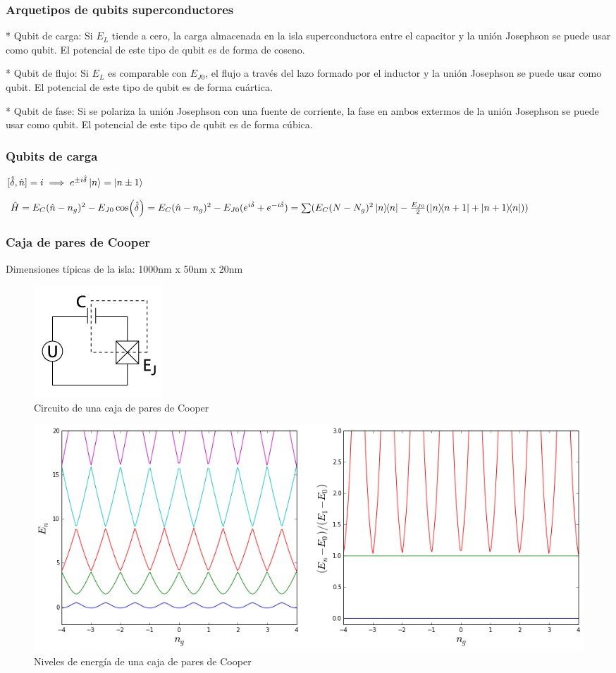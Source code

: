 \documentclass[xetex,mathserif,serif]{beamer}
\begin{document}
\begin{frame}
    \frametitle{Arquetipos de qubits superconductores}

\justify
* Qubit de carga: Si $E_L$ tiende a cero, la carga almacenada en la isla 
    superconductora entre el capacitor y  la unión Josephson se puede usar 
    como qubit. El potencial de este tipo de qubit es de forma de coseno.

\justify
* Qubit de flujo: Si $E_L$ es comparable con $E_{J0}$, el flujo a través 
    del lazo formado por el inductor y la unión Josephson se puede usar como 
    qubit. El potencial de este tipo de qubit es de forma cuártica.

\justify
* Qubit de fase: Si se polariza la unión Josephson con una fuente de 
    corriente, la fase en ambos extermos de la unión Josephson se puede 
    usar como qubit. El potencial de este tipo de qubit es de forma cúbica.

\end{frame}

\begin{frame}
    \frametitle{Qubits de carga}

$[\hat{\delta},\hat{n}]=i \implies e^{\pm i \hat{\delta}} \ket{n} = \ket{n\pm 1}$

$\hat{H} = E_C (\hat{n}-n_g)^2 - E_{J0} \cos(\hat{\delta}) =
 E_C (\hat{n}-n_g)^2 - E_{J0} (e^{i \hat{\delta}} + e^{-i \hat{\delta}}) =
 \sum(E_C(N-N_g)^2 \ketbra{n}{n} - \frac{E_{J0}}{2}(\ketbra{n}{n+1}+
 \ketbra{n+1}{n}))$

\end{frame}
 
\begin{frame}
 \frametitle{Caja de pares de Cooper}

Dimensiones típicas de la isla: 1000nm x 50nm x 20nm

\begin{figure}[H]
\centering \includegraphics[width=0.3\linewidth]{md/Avance1/cooperpairbox.png}
\caption{Circuito de una caja de pares de Cooper}
\label{fig:cooperpairboxcircuit}
\end{figure}

\begin{figure}[H]
\centering \includegraphics[width=0.3\linewidth]{md/Avance1/cooperenergy.png}
\caption{Niveles de energía de una caja de pares de Cooper}
\label{fig:cooperpairboxenergy}
\end{figure}

\end{frame}
\end{document}
